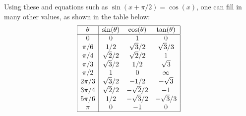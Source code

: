 \documentclass[a4paper]{book}
\newcommand{\tht}       {\theta}
\newcommand{\rr}        {\sqrt{3}}
\newcommand{\rs}        {\sqrt{6}}
\newcommand{\rt}        {\sqrt{2}}
\renewcommand{\:}{\colon}
\theoremstyle{definition}
\begin{document}
Using these
and equations such as $\sin(x+\pi/2)=\cos(x)$, one can fill in many
other values, as shown in the table below:
\[ \begin{array}{|c|ccc|}
    \hline
    \tht    & \sin(\tht)  & \cos(\tht) & \tan(\tht) \\
    \hline
      0     & 0           & 1           & 0         \\
      \pi/6 & 1/2         & \rr/2       & \rr/3     \\
      \pi/4 & \rt/2       & \rt/2       & 1         \\
      \pi/3 & \rr/2       & 1/2         & \rr       \\
      \pi/2 & 1           & 0           & \infty    \\
     2\pi/3 & \rr/2       & -1/2        & -\rr      \\
     3\pi/4 & \rt/2       & -\rt/2      & -1        \\
     5\pi/6 & 1/2         & -\rr/2      & -\rr/3    \\
      \pi   & 0           & -1          & 0         \\
   \hline
  \end{array}
\]
\end{document}
